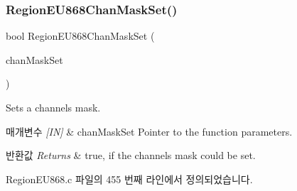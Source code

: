\subsubsection{\texorpdfstring{Region\+E\+U868\+Chan\+Mask\+Set()}{RegionEU868ChanMaskSet()}}
{\footnotesize\ttfamily bool Region\+E\+U868\+Chan\+Mask\+Set (\begin{DoxyParamCaption}\item[{\mbox{\hyperlink{group___r_e_g_i_o_n_ga6d24f7da136006410827dfb29f6b9b9e}{Chan\+Mask\+Set\+Params\+\_\+t}} $\ast$}]{chan\+Mask\+Set }\end{DoxyParamCaption})}



Sets a channels mask. 


\begin{DoxyParams}{매개변수}
{\em \mbox{[}\+I\+N\mbox{]}} & chan\+Mask\+Set Pointer to the function parameters.\\
\hline
\end{DoxyParams}

\begin{DoxyRetVals}{반환값}
{\em Returns} & true, if the channels mask could be set. \\
\hline
\end{DoxyRetVals}


Region\+E\+U868.\+c 파일의 455 번째 라인에서 정의되었습니다.


